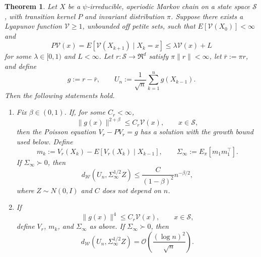 \documentclass[11pt]{article}
\newtheorem{theorem}{Theorem}
\newcommand{\ve}{\mathscr{V}}
\begin{document}
\begin{theorem}\label{thm: general}
Let $X$ be a $\psi$-irreducible, aperiodic Markov chain on a state space
$\mathcal S$, with transition kernel $P$ and invariant distribution $\pi$.
Suppose there exists a Lyapunov function $\ve\geq 1$, unbounded off petite
sets, such that $E[\ve(X_0)]<\infty$ and
\begin{equation}\label{eq: exp drift}
    P\ve(x)
    =
    E[\ve(X_{k+1})\mid X_k=x]
    \leq
    \lambda\ve(x)+L
\end{equation}
for some $\lambda\in[0,1)$ and $L<\infty$. Let $r:\mathcal S\to\Re^d$ satisfy $\pi\|r\|<\infty$,
let $\bar r:=\pi r$, and define
\[
    g:=r-\bar r,
    \qquad
    U_n:=\frac1{\sqrt n}\sum_{k=1}^n g(X_{k-1}).
\]
Then the following statements hold.
\begin{enumerate}
    \item Fix $\beta\in(0,1)$. If, for some $C_r<\infty$,
    \[
        \|g(x)\|^{2+\beta}\leq C_r\ve(x),
        \qquad x\in\mathcal S,
    \]
    then the Poisson equation $V_r-PV_r=g$ has a solution with the growth
    bound used below. Define
    \[
        m_k:=V_r(X_k)-E[V_r(X_k)\mid X_{k-1}],
        \qquad
        \Sigma_\infty:=E_\pi[m_1m_1^\top].
    \]
    If $\Sigma_\infty\succ0$, then
    \[
        d_{\mathcal W}(U_n,\Sigma_\infty^{1/2}Z)
        \leq
        \frac{C}{(1-\beta)^2}n^{-\beta/2},
    \]
    where $Z\sim N(0,I)$ and $C$ does not depend on $n$.

    \item If
    \[
        \|g(x)\|^4\leq C_r\ve(x),
        \qquad x\in\mathcal S,
    \]
    define $V_r$, $m_k$, and $\Sigma_\infty$ as above. If
    $\Sigma_\infty\succ0$, then
    \[
        d_{\mathcal W}(U_n,\Sigma_\infty^{1/2}Z)
        =
        \mathcal O\!\left(\frac{(\log n)^2}{\sqrt n}\right).
    \]
\end{enumerate}
\end{theorem}
\end{document}
